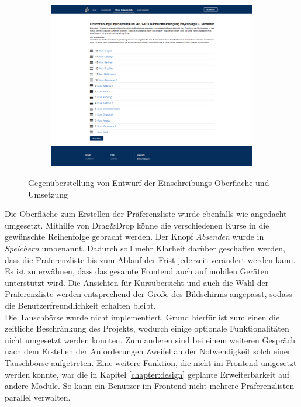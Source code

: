 {\begin{figure}[p]
\begin{subfigure}{\textwidth}
	                \includegraphics[trim={15cm 0cm 15cm 0},clip,width=\textwidth]{./implementation/images/preferences.png}
	            \end{subfigure}
	            \caption{Gegenüberstellung von Entwurf der Einschreibungs-Oberfläche und Umsetzung}
	            \label{fig:comparisonPrefenrences}
	        \end{figure}
	    }
    
        Die Oberfläche zum Erstellen der Präferenzliste wurde ebenfalls wie angedacht umgesetzt.
        Mithilfe von Drag\&Drop könne die verschiedenen Kurse in die gewünschte Reihenfolge gebracht werden.
        Der Knopf \textit{Absenden} wurde in \textit{Speichern} umbenannt.
        Dadurch soll mehr Klarheit darüber geschaffen werden, dass die Präferenzliste bis zum Ablauf der Frist jederzeit verändert werden kann.\\
        
        Es ist zu erwähnen, dass das gesamte Frontend auch auf mobilen Geräten unterstützt wird.
        Die Ansichten für Kursübersicht und auch die Wahl der Präferenzliste werden entsprechend der Größe des Bildschirms angepasst, sodass die Benutzerfreundlichkeit erhalten bleibt.\\
        
        Die Tauschbörse wurde nicht implementiert.
        Grund hierfür ist zum einen die zeitliche Beschränkung des Projekts, wodurch einige optionale Funktionalitäten nicht umgesetzt werden konnten.
        Zum anderen sind bei einem weiteren Gespräch nach dem Erstellen der Anforderungen Zweifel an der Notwendigkeit solch einer Tauschbörse aufgetreten.
        Eine weitere Funktion, die nicht im Frontend umgesetzt werden konnte, war die in Kapitel \ref{chapter:design} geplante Erweiterbarkeit auf andere Module.
        So kann ein Benutzer im Frontend nicht mehrere Präferenzlisten parallel verwalten.\\
        
